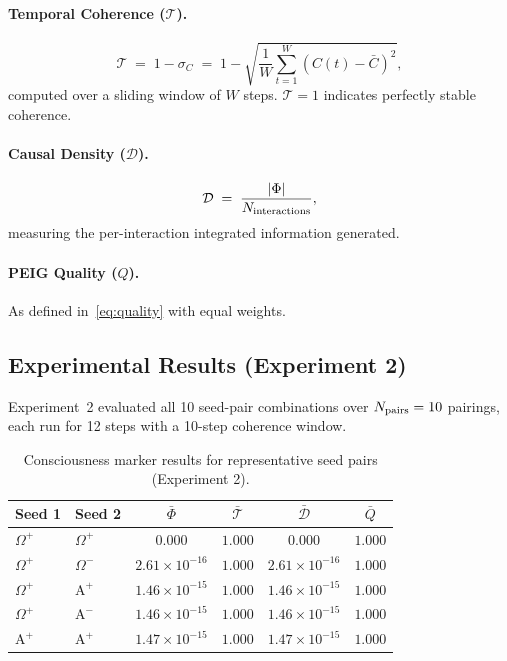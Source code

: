 \documentclass[12pt]{article}
\newcommand{\Alpha}{\mathrm{A}}
\begin{document}
\paragraph{Temporal Coherence ($\mathcal{T}$).}
\begin{equation}
\mathcal{T} \;=\; 1 - \sigma_C \;=\;
1 - \sqrt{\frac{1}{W}\sum_{t=1}^{W}(C(t)-\bar{C})^2},
\label{eq:temporal}
\end{equation}
computed over a sliding window of $W$ steps.  $\mathcal{T}=1$ indicates
perfectly stable coherence.

\paragraph{Causal Density ($\mathcal{D}$).}
\begin{equation}
\mathcal{D} \;=\; \frac{|\Phi|}{N_{\rm interactions}},
\label{eq:causal}
\end{equation}
measuring the per-interaction integrated information generated.

\paragraph{PEIG Quality ($Q$).}
As defined in~\eqref{eq:quality} with equal weights.

\subsection{Experimental Results (Experiment 2)}

Experiment~2 evaluated all 10 seed-pair combinations over $N_{\rm pairs} =
10$ pairings, each run for 12 steps with a 10-step coherence window.

\begin{table}[H]
\centering
\caption{Consciousness marker results for representative seed pairs
  (Experiment 2).}
\label{tab:markers}
\begin{tabular}{llcccc}
\toprule
\textbf{Seed 1} & \textbf{Seed 2} & $\bar{\Phi}$ &
$\bar{\mathcal{T}}$ & $\bar{\mathcal{D}}$ & $\bar{Q}$\\
\midrule
$\Omega^+$ & $\Omega^+$ & $0.000$    & $1.000$ & $0.000$    & $1.000$\\
$\Omega^+$ & $\Omega^-$ & $2.61\times10^{-16}$ & $1.000$ & $2.61\times10^{-16}$ & $1.000$\\
$\Omega^+$ & $\Alpha^+$ & $1.46\times10^{-15}$ & $1.000$ & $1.46\times10^{-15}$ & $1.000$\\
$\Omega^+$ & $\Alpha^-$ & $1.46\times10^{-15}$ & $1.000$ & $1.46\times10^{-15}$ & $1.000$\\
$\Alpha^+$ & $\Alpha^+$ & $1.47\times10^{-15}$ & $1.000$ & $1.47\times10^{-15}$ & $1.000$\\
\bottomrule
\end{tabular}
\end{table}
\end{document}
